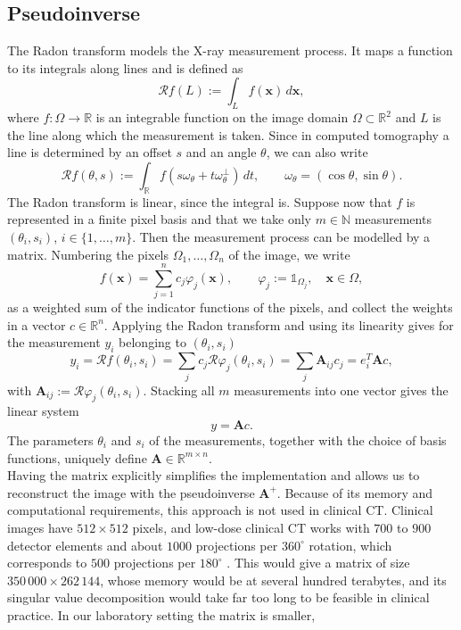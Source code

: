 \documentclass{article}
\numberwithin{equation}{section}
\begin{document}
\subsection{Pseudoinverse}\label{sec:pseudoinverse}
The Radon transform models the X-ray measurement process. It maps a function to its integrals along lines and is defined as
\[\mathcal{R}f(L):=\int_L f(\mathbf{x})\,d\mathbf{x},\]
where $f:\Omega\to\mathbb{R}$ is an integrable function on the image domain $\Omega\subset\mathbb{R}^2$ and $L$ is the line along which the measurement is taken.
Since in computed tomography a line is determined by an offset $s$ and an angle $\theta$, we can also write
\[\mathcal{R}f(\theta,s):=\int_\mathbb{R}f(s\omega_\theta + t\omega_\theta^\perp)\,dt, \qquad \omega_\theta=(\cos{\theta},\sin{\theta}).\]
The Radon transform is linear, since the integral is. Suppose now that $f$ is represented in a finite pixel basis and that we take only $m\in\mathbb{N}$ measurements $(\theta_i, s_i)$, $i\in\{1,\dots,m\}$. Then the measurement process can be modelled by a matrix. Numbering the pixels $\Omega_1,\dots,\Omega_n$ of the image, we write
\[f(\mathbf{x})=\sum_{j=1}^n c_j\varphi_j(\mathbf{x}),\qquad \varphi_j:=\mathds{1}_{\Omega_j},\quad \mathbf{x}\in\Omega,\]
as a weighted sum of the indicator functions of the pixels, and collect the weights in a vector $c\in\mathbb{R}^n$. Applying the Radon transform and using its linearity gives for the measurement $y_i$ belonging to $(\theta_i,s_i)$
\[y_i = \mathcal{R}f(\theta_i,s_i) = \sum_j c_j\mathcal{R}\varphi_j(\theta_i,s_i)=\sum_j\mathbf{A}_{ij}c_j=e_i^T\mathbf{A}c,\]
with $\mathbf{A}_{ij}:=\mathcal{R}\varphi_j(\theta_i,s_i)$. Stacking all $m$ measurements into one vector gives the linear system
\[y=\mathbf{A}c.\]
The parameters $\theta_i$ and $s_i$ of the measurements, together with the choice of basis functions, uniquely define $\mathbf{A}\in\mathbb{R}^{m\times n}$.\\
Having the matrix explicitly simplifies the implementation and allows us to reconstruct the image with the pseudoinverse $\mathbf{A}^{+}$. Because of its memory and computational requirements, this approach is not used in clinical CT\@.
Clinical images have $512 \times 512$ pixels, and low-dose clinical CT works with $700$ to $900$ detector elements and about $1000$ projections per $360^\circ$ rotation, which corresponds to $500$ projections per $180^\circ$ \parencite{Flohr2013}.
This would give a matrix of size $350\,000\times262\,144$, whose memory would be at several hundred terabytes, and its singular value decomposition would take far too long to be feasible in clinical practice. In our laboratory setting the matrix is smaller,
\end{document}
